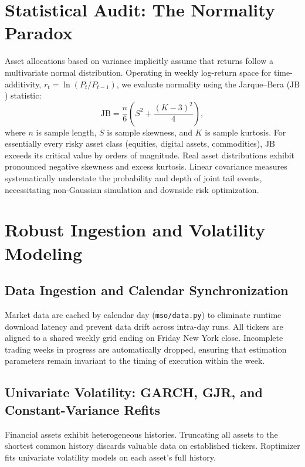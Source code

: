 \documentclass[11pt]{article}
\begin{document}
\section{Statistical Audit: The Normality Paradox}
Asset allocations based on variance implicitly assume that returns follow a multivariate normal distribution.
Operating in weekly log-return space for time-additivity, $r_t = \ln(P_t / P_{t-1})$, we evaluate normality
using the Jarque--Bera ($\mathrm{JB}$) statistic:
\begin{equation}
\mathrm{JB} = \frac{n}{6}\left( S^2 + \frac{(K-3)^2}{4}\right),
\end{equation}
where $n$ is sample length, $S$ is sample skewness, and $K$ is sample kurtosis. For essentially every risky
asset class (equities, digital assets, commodities), $\mathrm{JB}$ exceeds its critical value by orders of
magnitude. Real asset distributions exhibit pronounced negative skewness and excess kurtosis.
Linear covariance measures systematically understate the probability and depth of joint tail events,
necessitating non-Gaussian simulation and downside risk optimization.

\section{Robust Ingestion and Volatility Modeling}
\subsection{Data Ingestion and Calendar Synchronization}
Market data are cached by calendar day (\texttt{mso/data.py}) to eliminate runtime download latency and prevent
data drift across intra-day runs. All tickers are aligned to a shared weekly grid ending on Friday New York close.
Incomplete trading weeks in progress are automatically dropped, ensuring that estimation parameters remain
invariant to the timing of execution within the week.

\subsection{Univariate Volatility: GARCH, GJR, and Constant-Variance Refits}
Financial assets exhibit heterogeneous histories. Truncating all assets to the shortest common history
discards valuable data on established tickers. Roptimizer fits univariate volatility models on each asset's
full history.
\end{document}

